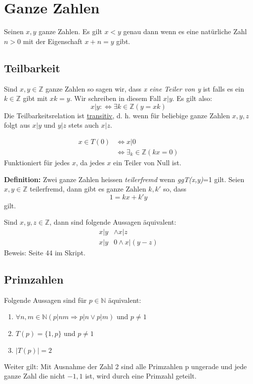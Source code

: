 \chapter{Ganze Zahlen} %
\label{cha:ganze_zahlen}
Seinen \(x,y\) ganze Zahlen. Es gilt \(x < y\) genau dann wenn es eine natürliche Zahl \(n > 0\) mit der Eigenschaft \(x+n=y\) gibt.
\section{Teilbarkeit} %
\label{sec:teilbarkeit}
Sind \(x,y \in \mathbb{Z}\) ganze Zahlen so sagen wir, dass \emph{x eine Teiler von y} ist falls es ein \(k \in \mathbb{Z}\) gibt mit \(xk = y\). Wir schreiben in diesem Fall \(x|y\). Es gilt also:
\[ x | y : \Leftrightarrow \exists k \in \mathbb{Z} (y=xk)\]
Die Teilbarkeitsrelation ist \underline{transitiv}, d. h. wenn für beliebige ganze Zahlen \(x,y,z\) folgt aus \(x|y\) und \(y|z\) stets auch \(x|z\).

\begin{bsp}
\begin{align*}
	x \in T(0) &\Leftrightarrow x| 0\\
	&\Leftrightarrow \exists_k \in \mathbb{Z} (kx = 0)
\end{align*}
Funktioniert für jedes $x$, da jedes $x$ ein Teiler von Null ist.
\end{bsp}

\textbf{Definition:} Zwei ganze Zahlen heissen \emph{teilerfremd} wenn \emph{ggT(x,y)}=1 gilt.\newline
Seien \(x,y \in \mathbb{Z}\) teilerfremd, dann gibt es ganze Zahlen \(k, k'\) so, dass
\[ 1 = kx + k'y \]
gilt.

\begin{definition}
Sind $x,y,z \in \mathbb{Z}$, dann sind folgende Aussagen äquivalent:
\begin{align*}
x|y &\wedge x|z \\
x|y &0\wedge x|(y-z)
\end{align*}
Beweis: Seite 44 im Skript.
\end{definition}

\section{Primzahlen} %
\label{sec:primzahlen}
Folgende Aussagen sind für \(p \in \mathbb{N}\) äquivalent:
\begin{enumerate}
	\item \( \forall{n,m} \in \mathbb{N} (p|nm \Rightarrow p|n \vee p|m)\) und \(p \neq 1\)
	\item \( T(p) = \{1,p\}\) und  \(p \neq 1\)
	\item \(|T(p)| = 2\)
\end{enumerate}
Weiter gilt:\newline
Mit Ausnahme der Zahl 2 sind alle Primzahlen p ungerade und jede ganze Zahl die nicht $-1,1$ ist, wird durch eine Primzahl geteilt.

